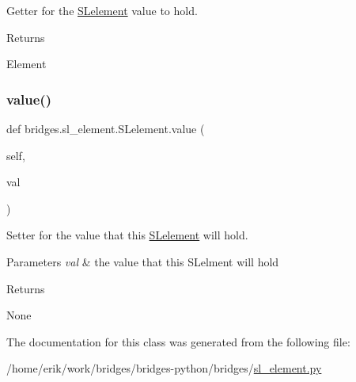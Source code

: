 Getter for the \hyperlink{classbridges_1_1sl__element_1_1_s_lelement}{S\+Lelement} value to hold. 

\begin{DoxyReturn}{Returns}


Element 
\end{DoxyReturn}
\mbox{\label{classbridges_1_1sl__element_1_1_s_lelement_a7653b41a8bc2c8ba7a71f07c8b0b8f3f}} 
\subsubsection{\texorpdfstring{value()}{value()}\hspace{0.1cm}{\footnotesize\ttfamily [2/2]}}
{\footnotesize\ttfamily def bridges.\+sl\+\_\+element.\+S\+Lelement.\+value (\begin{DoxyParamCaption}\item[{}]{self,  }\item[{}]{val }\end{DoxyParamCaption})}



Setter for the value that this \hyperlink{classbridges_1_1sl__element_1_1_s_lelement}{S\+Lelement} will hold. 


\begin{DoxyParams}{Parameters}
{\em val} & the value that this S\+Lelment will hold \\
\hline
\end{DoxyParams}
\begin{DoxyReturn}{Returns}


None 
\end{DoxyReturn}


The documentation for this class was generated from the following file\+:\begin{DoxyCompactItemize}
\item 
/home/erik/work/bridges/bridges-\/python/bridges/\hyperlink{sl__element_8py}{sl\+\_\+element.\+py}\end{DoxyCompactItemize}
